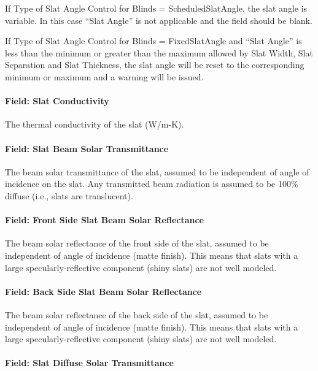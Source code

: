 If Type of Slat Angle Control for Blinds = ScheduledSlatAngle, the slat angle is variable. In this case ``Slat Angle'' is not applicable and the field should be blank.

If Type of Slat Angle Control for Blinds = FixedSlatAngle and ``Slat Angle'' is less than the minimum or greater than the maximum allowed by Slat Width, Slat Separation and Slat Thickness, the slat angle will be reset to the corresponding minimum or maximum and a warning will be issued.

\paragraph{Field: Slat Conductivity}\label{field-slat-conductivity}

The thermal conductivity of the slat (W/m-K).

\paragraph{Field: Slat Beam Solar Transmittance}\label{field-slat-beam-solar-transmittance}

The beam solar transmittance of the slat, assumed to be independent of angle of incidence on the slat. Any transmitted beam radiation is assumed to be 100\% diffuse (i.e., slats are translucent).

\paragraph{Field: Front Side Slat Beam Solar Reflectance}\label{field-front-side-slat-beam-solar-reflectance}

The beam solar reflectance of the front side of the slat, assumed to be independent of angle of incidence (matte finish). This means that slats with a large specularly-reflective component (shiny slats) are not well modeled.

\paragraph{Field: Back Side Slat Beam Solar Reflectance}\label{field-back-side-slat-beam-solar-reflectance}

The beam solar reflectance of the back side of the slat, assumed to be independent of angle of incidence (matte finish). This means that slats with a large specularly-reflective component (shiny slats) are not well modeled.

\paragraph{Field: Slat Diffuse Solar Transmittance}\label{field-slat-diffuse-solar-transmittance}

